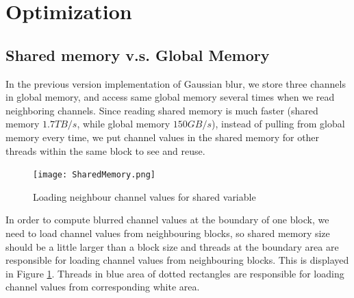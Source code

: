 \documentclass[journal,11pt,onecolumn,draftclsnofoot]{ieeeconf}  %
\begin{document}
\section{Optimization}

\subsection{Shared memory v.s. Global Memory} \label{shared}
In the previous version implementation of Gaussian blur, we store three channels in global memory, and access same global memory several times when we read neighboring channels. Since reading shared memory is much faster (shared memory $1.7TB/s$, while global memory $150GB/s$), instead of pulling from global memory every time, we put channel values in the shared memory for other threads within the same block to see and reuse. 

\begin{figure}[h]
	\centering\texttt{[image: SharedMemory.png]}
	\caption{Loading neighbour channel values for shared variable}
	\label{sharedMemory}
	\vspace*{-5mm}
\end{figure}
In order to compute blurred channel values at the boundary of one block, we need to load channel values from neighbouring blocks, so shared memory size should be a little larger than a block size and threads at the boundary area are responsible for loading channel values from neighbouring blocks. This is displayed in Figure \ref{sharedMemory}. Threads in blue area of dotted rectangles are responsible for loading channel values from corresponding white area.
\end{document}
